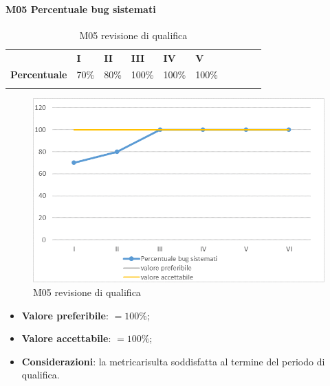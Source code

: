 \paragraph{M05 Percentuale bug sistemati} \mbox{}
\begin{longtable}[H!] {						
		>{}p{50mm}  		
		>{}p{8mm}
		>{}p{8mm}		
		>{}p{8mm}		
		>{}p{8mm}		
		>{}p{8mm}		
		>{}p{8mm}
		>{}p{8mm}
		>{}p{8mm}
		>{}p{8mm}
	}
	\rowcolor{gray!50}
	\textbf{} & \textbf{I} & \textbf{II} & \textbf{III} & \textbf{IV} & \textbf{V} \TBstrut \\ [2mm]
	\textbf{Percentuale} & 70\% & 80\% & 100\% & 100\% & 100\% \TBstrut \\ [2mm]
	\rowcolor{white}
	\caption{M05 revisione di qualifica}
\end{longtable}
\begin{figure}[H] 	
	\includegraphics[width=\linewidth]{./img/grafici/RQ5.png}	
	\caption{M05 revisione di qualifica}	
\end{figure}
\begin{itemize}
	\item \textbf{Valore preferibile}: $=100\%$;
	\item \textbf{Valore accettabile}: $=100\%$;
	\item \textbf{Considerazioni}: la metrica\glosp risulta soddisfatta al termine del periodo di qualifica.
\end{itemize}



